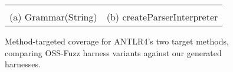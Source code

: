 \begin{figure}[b]
    \centering
    \begin{tabular}{cc}
         &
         \\
        (a) Grammar(String) & (b) createParserInterpreter
    \end{tabular}
    \caption{Method-targeted coverage for ANTLR4's two target methods, comparing OSS-Fuzz harness variants against our generated harnesses.}
    \label{fig:antlr4-coverage}
\end{figure}
